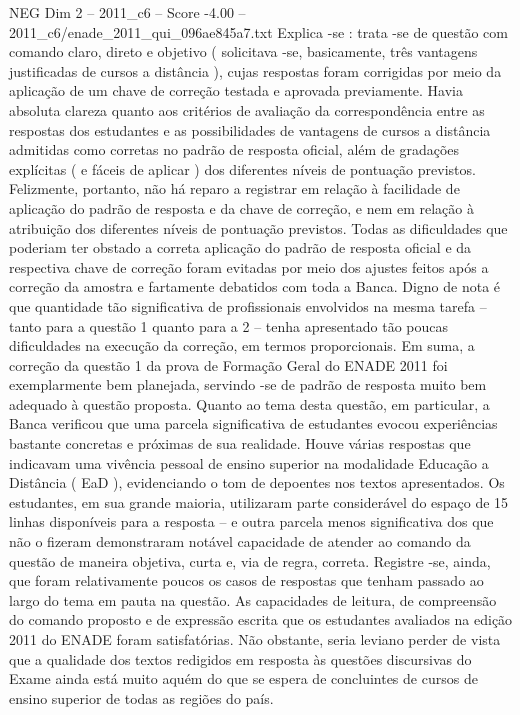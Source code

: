 \begin{textsample}{NEG Dim 2 – 2011\_c6 – Score -4.00 – 2011\_c6/enade\_2011\_qui\_096ae845a7.txt}
Explica -se : trata -se de questão com comando claro, direto e objetivo ( solicitava -se, basicamente, três vantagens justificadas de cursos a distância ), cujas respostas foram corrigidas por meio da aplicação de um chave de correção testada e aprovada previamente.
Havia absoluta clareza quanto aos critérios de avaliação da correspondência entre as respostas dos estudantes e as possibilidades de vantagens de cursos a distância admitidas como corretas no padrão de resposta oficial, além de gradações explícitas ( e fáceis de aplicar ) dos diferentes níveis de pontuação previstos.
Felizmente, portanto, não há reparo a registrar em relação à facilidade de aplicação do padrão de resposta e da chave de correção, e nem em relação à atribuição dos diferentes níveis de pontuação previstos.
Todas as dificuldades que poderiam ter obstado a correta aplicação do padrão de resposta oficial e da respectiva chave de correção foram evitadas por meio dos ajustes feitos após a correção da amostra e fartamente debatidos com toda a Banca.
Digno de nota é que quantidade tão significativa de profissionais envolvidos na mesma tarefa – tanto para a questão 1 quanto para a 2 – tenha apresentado tão poucas dificuldades na execução da correção, em termos proporcionais.
Em suma, a correção da questão 1 da prova de Formação Geral do ENADE 2011 foi exemplarmente bem planejada, servindo -se de padrão de resposta muito bem adequado à questão proposta.
Quanto ao tema desta questão, em particular, a Banca verificou que uma parcela significativa de estudantes evocou experiências bastante concretas e próximas de sua realidade.
Houve várias respostas que indicavam uma vivência pessoal de ensino superior na modalidade Educação a Distância ( EaD ), evidenciando o tom de depoentes nos textos apresentados.
Os estudantes, em sua grande maioria, utilizaram parte considerável do espaço de 15 linhas disponíveis para a resposta – e outra parcela menos significativa dos que não o fizeram demonstraram notável capacidade de atender ao comando da questão de maneira objetiva, curta e, via de regra, correta.
Registre -se, ainda, que foram relativamente poucos os casos de respostas que tenham passado ao largo do tema em pauta na questão.
As capacidades de leitura, de compreensão do comando proposto e de expressão escrita que os estudantes avaliados na edição 2011 do ENADE foram satisfatórias.
Não obstante, seria leviano perder de vista que a qualidade dos textos redigidos em resposta às questões discursivas do Exame ainda está muito aquém do que se espera de concluintes de cursos de ensino superior de todas as regiões do país.

\end{textsample}
